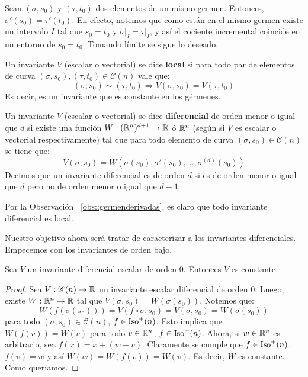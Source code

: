 \begin{obs}\label{obs::germenderivadas}
Sean $(\sigma,s_0)$ y $(\tau,t_0)$ dos elementos de un mismo germen. Entonces, $\sigma'(s_0)=\tau'(t_0)$. En efecto, notemos que como están en el mismo germen existe un intervalo $I$ tal que $s_0=t_0$ y $\left.\sigma\right|_{I}=\left.\tau\right|_{I}$, y así el cociente incremental coincide en un entorno de $s_0=t_0$. Tomando límite se sigue lo deseado.
\end{obs}

\begin{defn}
Un invariante $V$ (escalar o vectorial) se dice \textbf{local} si para todo par de elementos de curva $(\sigma,s_0),(\tau,t_0)\in\mathscr{C}(n)$ vale que: $$(\sigma,s_0)\sim(\tau,t_0) \Longrightarrow V(\sigma,s_0) = V(\tau,t_0)$$ Es decir, es un invariante que es constante en los gérmenes.
\end{defn}

\begin{defn}
Un invariante $V$ (escalar o vectorial) se dice \textbf{diferencial} de orden menor o igual que $d$ si existe una función $W:(\mathbb{R}^n)^{d+1}\to \mathbb{R}$ ó $\mathbb{R}^n$ (según si $V$ es escalar o vectorial respectivamente) tal que para todo elemento de curva $(\sigma,s_0)\in\mathscr{C}(n)$ se tiene que: $$V(\sigma,s_0)=W(\sigma(s_0),\sigma'(s_0),\ldots ,\sigma^{(d)}(s_0))$$ Decimos que un invariante diferencial es de orden $d$ si es de orden menor o igual que $d$ pero no de orden menor o igual que $d-1$.
\end{defn}

\begin{obs} Por la Observación ~\ref{obs::germenderivadas}, es claro que todo invariante diferencial es local.
\end{obs}

Nuestro objetivo ahora será tratar de caracterizar a los invariantes diferenciales. Empecemos con los invariantes de orden bajo. 

\begin{prop}
Sea $V$ un invariante diferencial escalar de orden $0$. Entonces $V$ es constante.
\begin{proof}
Sea $V:\mathscr{C}(n)\to \mathbb{R}$ un invariante escalar diferencial de orden $0$. Luego, existe $W:\mathbb{R}^n\to\mathbb{R}$ tal que $V(\sigma,s_0)=W(\sigma(s_0))$. Notemos que: $$W(f(\sigma(s_0))) = V(f\circ\sigma,s_0)=V(\sigma,s_0)=W(\sigma(s_0))$$ para todo $(\sigma,s_0)\in\mathscr{C}(n)$, $f\in\operatorname{Iso}^+(n)$. Esto implica que $W(f(v))=W(v)$ para todo $v\in\mathbb{R}^n$, $f\in\operatorname{Iso}^+(n)$. Ahora, si $w\in\mathbb{R}^n$ es arbitrario, sea $f(x)=x+(w-v)$. Claramente se cumple que $f\in\operatorname{Iso}^+(n)$, $f(v)=w$ y así $W(w)=W(f(v))=W(v)$. Es decir, $W$ es constante. Como queríamos.
\end{proof}
\end{prop}

